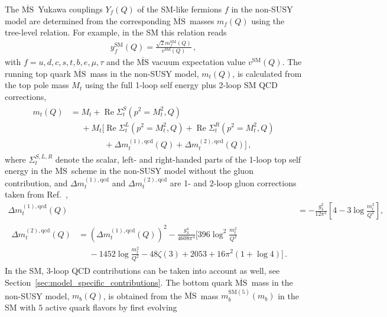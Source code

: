 \documentclass[final,3p,11pt,pdflatex]{elsarticle}
\newcommand{\ol}[1]{\overline{#1}}
\newcommand{\MSbar}{\ensuremath{\ol{\text{MS}}}\xspace}
\newcommand{\SM}{\ensuremath{\text{SM}}\xspace}
\newcommand{\secref}[1]{Section~\ref{#1}}
\DeclareMathOperator{\re}{Re}
\begin{document}
The \MSbar\ Yukawa couplings $Y_f(Q)$ of the SM-like
fermions $f$ in the non-SUSY model are determined from the
corresponding \MSbar\ masses $m_f(Q)$ using the tree-level
relation. For example, in the SM this relation reads
%
\begin{align}
  y_f^{\SM}(Q) = \frac{\sqrt{2} m_f^{\SM}(Q)}{v^{\SM}(Q)} \,,
\end{align}
%
with $f = u,d,c,s,t,b,e,\mu,\tau$ and the \MSbar vacuum expectation value $v^{\SM}(Q)$.
The running top quark \MSbar\ mass in the non-SUSY model, $m_t(Q)$, is
calculated from the top pole mass $M_t$
using the full 1-loop self energy plus 2-loop SM QCD
corrections,
%
\begin{align}
\begin{split}
  m_t(Q) &= M_t + \re\Sigma_{t}^S(p^2=M_t^2,Q) \\
  &\phantom{={}} + M_t \Big[ \re\Sigma_{t}^L(p^2=M_t^2,Q) +
    \re\Sigma_{t}^R(p^2=M_t^2,Q) \\
  &\phantom{={} + M_t \Big[}
    + \Delta m_t^{(1),\text{qcd}}(Q) + \Delta m_t^{(2),\text{qcd}}(Q) \Big]
  \,,
\end{split} \label{eq:mt_MSbar_default}
\end{align}
%
where $\Sigma_{t}^{S,L,R}$ denote the scalar, left- and right-handed
parts of the 1-loop top self energy in the \MSbar\ scheme in the
non-SUSY model without the gluon
contribution, and $\Delta m_t^{(1),\text{qcd}}$ and $\Delta
m_t^{(2),\text{qcd}}$ are 1- and 2-loop gluon corrections taken from
Ref.~\cite{Fleischer:1998dw},
%
\begin{align}
  \Delta m_t^{(1),\text{qcd}}(Q) &=
  -\frac{g_3^2}{12 \pi^2} \left[4 - 3 \log\frac{m_t^2}{Q^2}\right],
  \label{eq:top-selfenergy-qcd-1L}\\
  \begin{split}
    \Delta m_t^{(2),\text{qcd}}(Q) &= \left(\Delta
      m_t^{(1),\text{qcd}}(Q)\right)^2 - \frac{g_3^4}{4608 \pi^4}
    \Bigg[396 \log^2\frac{m_t^2}{Q^2} \\
    &\phantom{={}} - 1452 \log\frac{m_t^2}{Q^2}
    - 48 \zeta(3) + 2053 + 16 \pi^2 (1+\log 4)\Bigg] \,.
  \end{split}
  \label{eq:top-selfenergy-qcd-2L}
\end{align}
%
In the SM, 3-loop QCD contributions can be taken into
account as well, see \secref{sec:model_specific_contributions}.
%
The bottom quark \MSbar\ mass in the non-SUSY model, $m_b(Q)$, is
obtained from the \MSbar\ mass $m_b^{\SM(5)}(m_b)$ in the SM with $5$ active quark flavors by first evolving
\end{document}
